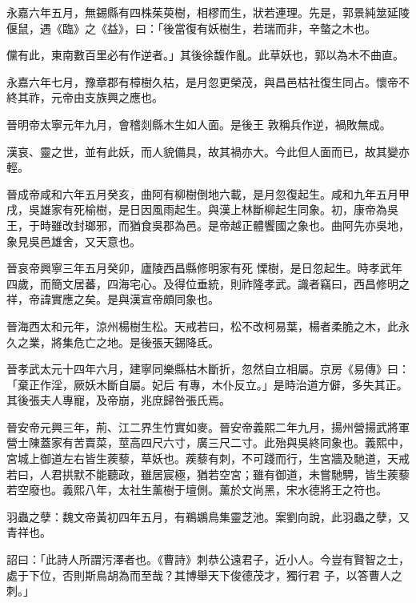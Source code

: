 \begin{pinyinscope}
 永嘉六年五月，無錫縣有四株茱萸樹，相樛而生，狀若連理。先是，郭景純筮延陵偃鼠，遇《臨》之《益》，曰：「後當復有妖樹生，若瑞而非，辛螫之木也。



 儻有此，東南數百里必有作逆者。」其後徐馥作亂。此草妖也，郭以為木不曲直。



 永嘉六年七月，豫章郡有樟樹久枯，是月忽更榮茂，與昌邑枯社復生同占。懷帝不終其祚，元帝由支族興之應也。



 晉明帝太寧元年九月，會稽剡縣木生如人面。是後王
 敦稱兵作逆，禍敗無成。



 漢哀、靈之世，並有此妖，而人貌備具，故其禍亦大。今此但人面而已，故其變亦輕。



 晉成帝咸和六年五月癸亥，曲阿有柳樹倒地六載，是月忽復起生。咸和九年五月甲戌，吳雄家有死榆樹，是日因風雨起生。與漢上林斷柳起生同象。初，康帝為吳王，于時雖改封瑯邪，而猶食吳郡為邑。是帝越正體饗國之象也。曲阿先亦吳地，象見吳邑雄舍，又天意也。



 晉哀帝興寧三年五月癸卯，廬陵西昌縣修明家有死
 慄樹，是日忽起生。時孝武年四歲，而簡文居蕃，四海宅心。及得位垂統，則祚隆孝武。識者竊曰，西昌修明之祥，帝諱實應之矣。是與漢宣帝頗同象也。



 晉海西太和元年，涼州楊樹生松。天戒若曰，松不改柯易葉，楊者柔脆之木，此永久之業，將集危亡之地。是後張天錫降氐。



 晉孝武太元十四年六月，建寧同樂縣枯木斷折，忽然自立相屬。京房《易傳》曰：「棄正作淫，厥妖木斷自屬。妃后
 有專，木仆反立。」是時治道方僻，多失其正。其後張夫人專寵，及帝崩，兆庶歸咎張氏焉。



 晉安帝元興三年，荊、江二界生竹實如麥。晉安帝義熙二年九月，揚州營揚武將軍營士陳蓋家有苦賣菜，莖高四尺六寸，廣三尺二寸。此殆與吳終同象也。義熙中，宮城上御道左右皆生蒺藜，草妖也。蒺藜有刺，不可踐而行，生宮牆及馳道，天戒若曰，人君拱默不能聽政，雖居宸極，猶若空宮；雖有御道，未嘗馳騁，皆生蒺藜
 若空廢也。義熙八年，太社生薰樹于壇側。薰於文尚黑，宋水德將王之符也。



 羽蟲之孽：魏文帝黃初四年五月，有鵜鶘鳥集靈芝池。案劉向說，此羽蟲之孽，又青祥也。



 詔曰：「此詩人所謂污澤者也。《曹詩》刺恭公遠君子，近小人。今豈有賢智之士，處于下位，否則斯鳥胡為而至哉？其博舉天下俊德茂才，獨行君
 子，以答曹人之刺。」




\end{pinyinscope}
